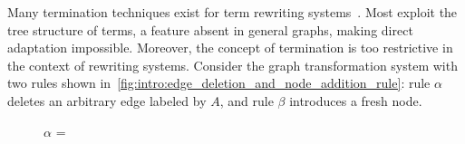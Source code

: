 Many termination techniques exist for term rewriting systems~\cite{nipkow1998term, dershowitz1982orderings, middeldorp1997simple, arts2000termination}.  
Most exploit the tree structure of terms, a feature absent in general graphs, making direct adaptation impossible. 
Moreover, the concept of termination is too restrictive in the context of rewriting systems. Consider the graph transformation system with two rules shown in~\autoref{fig:intro:edge_deletion_and_node_addition_rule}: rule $\alpha$ deletes an arbitrary edge labeled by $A$, and rule $\beta$ introduces a fresh node.
  \begin{figure}[!ht]
        \centering
        $\alpha$ = {
        }
    

\end{figure}
